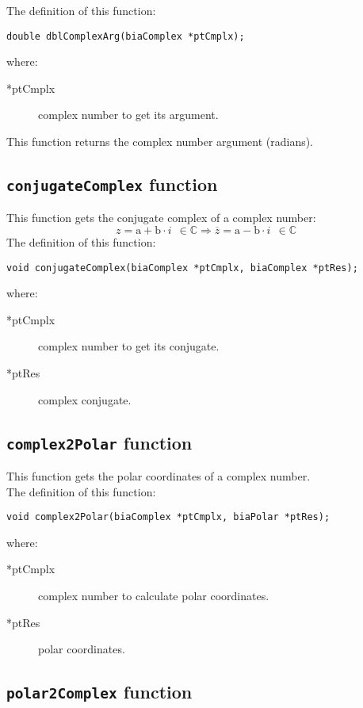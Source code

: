 The definition of this function:
%
\begin{verbatim}
double dblComplexArg(biaComplex *ptCmplx);  
\end{verbatim}
%
where:
%
\begin{description}
\item[*ptCmplx] complex number to get its argument.
\end{description}
%
This function returns the complex number argument (radians).

\subsection{\texttt{conjugateComplex} function}

This function gets the conjugate complex of a complex number:
%
\begin{displaymath}
z = \textrm{a} + \textrm{b} \cdot i \ \ \in \mathbb{C} \Rightarrow \overline{z} = \textrm{a} - \textrm{b} \cdot i \ \ \in \mathbb{C}
\end{displaymath}
%
The definition of this function:
%
\begin{verbatim}
void conjugateComplex(biaComplex *ptCmplx, biaComplex *ptRes);  
\end{verbatim}
%
where:
%
\begin{description}
\item[*ptCmplx] complex number to get its conjugate.
\item[*ptRes] complex conjugate.
\end{description}

\subsection{\texttt{complex2Polar} function}

This function gets the polar coordinates of a complex number.\\

The definition of this function:
%
\begin{verbatim}
void complex2Polar(biaComplex *ptCmplx, biaPolar *ptRes);  
\end{verbatim}
%
where:
%
\begin{description}
\item[*ptCmplx] complex number to calculate polar coordinates.
\item[*ptRes] polar coordinates.
\end{description}

\subsection{\texttt{polar2Complex} function}

